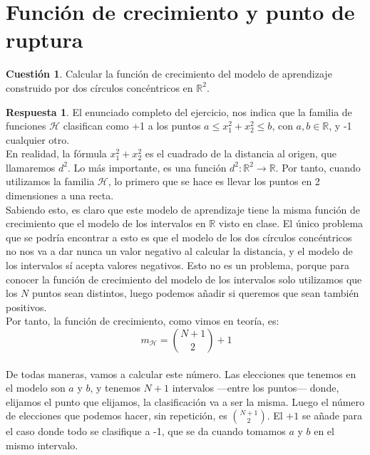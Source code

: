 \documentclass[10pt,a4paper]{article}
\theoremstyle{definition}
\newtheorem*{cuestion}{Cuestión}
\newtheorem*{respuesta}{Respuesta}
\begin{document}
\newpage

\section{Función de crecimiento y punto de ruptura}
\begin{cuestion}
Calcular la función de crecimiento del modelo de aprendizaje construido por dos círculos concéntricos en $\mathbb{R}^{2}$.
\end{cuestion}
\begin{respuesta}
El enunciado completo del ejercicio, nos indica que la familia de funciones $\mathcal{H}$ clasifican como +1 a los puntos $a \leq x^{2}_{1}+x^{2}_{2} \leq b$, con $a,b \in \mathbb{R}$, y -1 cualquier otro.\\

En realidad, la fórmula $x^{2}_{1}+x^{2}_{2}$ es el cuadrado de la distancia al origen, que llamaremos $d^{2}$. Lo más importante, es una función $d^{2}: \mathbb{R}^{2} \longrightarrow \mathbb{R}$. Por tanto, cuando utilizamos la familia $\mathcal{H}$, lo primero que se hace es llevar los puntos en 2 dimensiones a una recta.\\

Sabiendo esto, es claro que este modelo de aprendizaje tiene la misma función de crecimiento que el modelo de los intervalos en $\mathbb{R}$ visto en clase. El único problema que se podría encontrar a esto es que el modelo de los dos círculos concéntricos no nos va a dar nunca un valor negativo al calcular la distancia, y el modelo de los intervalos sí acepta valores negativos. Esto no es un problema, porque para conocer la función de crecimiento del modelo de los intervalos solo utilizamos que los $N$ puntos sean distintos, luego podemos añadir si queremos que sean también positivos.\\

Por tanto, la función de crecimiento, como vimos en teoría, es:\\

\[
\	m_{\mathcal{H}} = {N+1 \choose 2} + 1
\]\\

De todas maneras, vamos a calcular este número. Las elecciones que tenemos en el modelo son $a$ y $b$, y tenemos $N+1$ intervalos ---entre los puntos--- donde, elijamos el punto que elijamos, la clasificación va a ser la misma. Luego el número de elecciones que podemos hacer, sin repetición, es ${N+1 \choose 2} $. El $+1$ se añade para el caso donde todo se clasifique a -1, que se da cuando tomamos $a$ y $b$ en el mismo intervalo. 
\end{respuesta}
\end{document}
